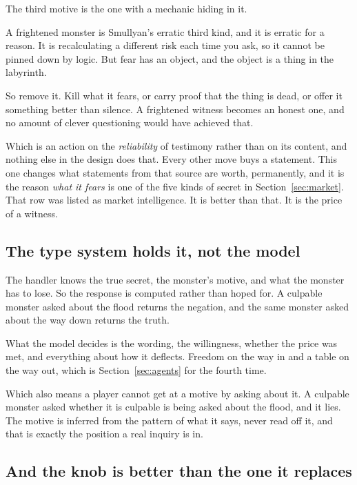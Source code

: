 \documentclass[11pt,a4paper]{article}
\begin{document}
The third motive is the one with a mechanic hiding in it.

A frightened monster is Smullyan's erratic third kind, and it is erratic for a reason. It is
recalculating a different risk each time you ask, so it cannot be pinned down by logic. But fear has
an object, and the object is a thing in the labyrinth.

So remove it. Kill what it fears, or carry proof that the thing is dead, or offer it something
better than silence. A frightened witness becomes an honest one, and no amount of clever
questioning would have achieved that.

\begin{alarmbox}
Which is an action on the \emph{reliability} of testimony rather than on its content, and nothing
else in the design does that. Every other move buys a statement. This one changes what statements
from that source are worth, permanently, and it is the reason \emph{what it fears} is one of the
five kinds of secret in Section~\ref{sec:market}. That row was listed as market intelligence. It is
better than that. It is the price of a witness.
\end{alarmbox}

\subsection{The type system holds it, not the model}

The handler knows the true secret, the monster's motive, and what the monster has to lose. So the
response is computed rather than hoped for. A culpable monster asked about the flood returns the
negation, and the same monster asked about the way down returns the truth.

What the model decides is the wording, the willingness, whether the price was met, and everything
about how it deflects. Freedom on the way in and a table on the way out, which is
Section~\ref{sec:agents} for the fourth time.

\begin{sectionbox}
Which also means a player cannot get at a motive by asking about it. A culpable monster asked
whether it is culpable is being asked about the flood, and it lies. The motive is inferred from the
pattern of what it says, never read off it, and that is exactly the position a real inquiry is in.
\end{sectionbox}

\subsection{And the knob is better than the one it replaces}
\end{document}
